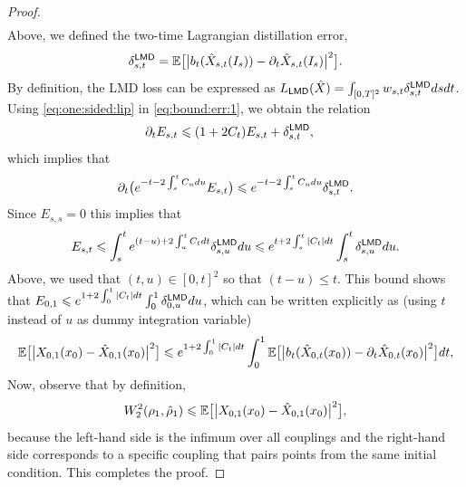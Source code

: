 \begin{proof}
\begin{equation}
\begin{aligned}
		\end{aligned}
	\end{equation}
	Above, we defined the two-time Lagrangian distillation error,
	\begin{equation}
		\delta^{\mathsf{LMD}}_{s,t} = \mathbb{E}\big[\big|b_t(\hat X_{s, t}(I_s)) - \partial_t \hat{X}_{s, t}(I_s)\big|^2\big].
	\end{equation}
	By definition, the LMD loss can be expressed as  $L_{\mathsf{LMD}}(\hat X) = \int_{[0,T]^2} w_{s,t} \delta^{\mathsf{LMD}}_{s,t} ds dt$.
	Using \eqref{eq:one:sided:lip} in \eqref{eq:bound:err:1}, we obtain the relation
	\begin{equation}
		\begin{aligned}
			 & \partial_t E_{s,t} \leqslant  (1+2C_t)E_{s,t} + \delta_{s,t}^{\mathsf{LMD}},
		\end{aligned}
	\end{equation}
	which implies that
	\begin{equation}
		\begin{aligned}
			\partial_t \big( e^{-t-2\int_s^t C_u du}E_{s,t} \big) \leqslant  e^{-t-2\int_s^t C_u du} \delta_{s,t}^{\mathsf{LMD}}.
		\end{aligned}
	\end{equation}
	Since $E_{s,s} = 0$ this implies that
	\begin{equation}
		E_{s,t} \leqslant \int_s^t e^{(t-u)+2\int_u^t C_t dt} \delta^{\mathsf{LMD}}_{s,u} du \leqslant e^{t+2\int_s^t |C_t| dt} \int_s^t \delta^{\mathsf{LMD}}_{s,u} du.
	\end{equation}
	Above, we used that $(t, u) \in [0, t]^2$ so that $(t - u) \leq t$.
	This bound shows that $E_{0,1} \leqslant e^{1+2\int_0^1 |C_t| dt} \int_0^1 \delta^{\mathsf{LMD}}_{0,u} du$, which can be written explicitly as (using $t$ instead of $u$ as dummy integration variable)
	\begin{equation}
		\mathbb{E}\big[\big|X_{0, 1}(x_0) - \hat{X}_{0, 1}(x_0)\big|^2\big] \leqslant e^{1+2\int_0^1 |C_t| dt} \int_0^1 \mathbb{E}\big[\big|b_t(\hat X_{0, t}(x_0)) - \partial_t \hat{X}_{0, t}(x_0)\big|^2\big]dt,
	\end{equation}
	Now, observe that by definition,
	\begin{equation}
		\label{eqn:wasserstein_bound}
		W_2^2(\rho_1, \hat{\rho}_1) \leqslant \mathbb{E}\big[\big|X_{0, 1}(x_0) - \hat{X}_{0, 1}(x_0)\big|^2\big],
	\end{equation}
	because the left-hand side is the infimum over all couplings and the right-hand side corresponds to a specific coupling that pairs points from the same initial condition. This completes the proof.
\end{proof}

